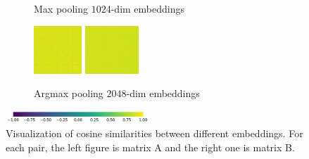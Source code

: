 \documentclass[final]{cvpr}
\begin{document}
\begin{figure}[t]
\begin{subfigure}[t]{0.5\linewidth}
		\vspace{-0.1\baselineskip}
		\caption{\centering Max pooling $1024$-dim embeddings}
	\end{subfigure}
	\par\medskip
	\begin{subfigure}[t]{0.5\linewidth}
		\captionsetup{width=.9\linewidth, justification=raggedright}
		\includegraphics[height=1.8cm]{fig/matrices/a_amax.png}
		\includegraphics[height=1.8cm]{fig/matrices/b_amax.png}
		\vspace{-0.1\baselineskip}
		\caption{\centering Argmax pooling $2048$-dim embeddings}
	\end{subfigure}\hfill
	\centering
	\par\medskip
	\includegraphics[width=0.48\textwidth]{fig/colorbar}
	\caption{Visualization of cosine similarities between different embeddings. For each pair, the left figure is matrix A and the right one is matrix B.}
	\label{fig:self_supervised_embeddings}
\end{figure}
\end{document}
